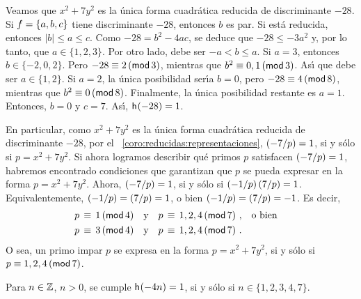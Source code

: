 \begin{ejemReducidas}\label{ejem:reducidas}
	Veamos que $x^2+7y^2$ es la \'unica forma cuadr\'atica
	reducida de discriminante $-28$. Si $f=\binaria{a,b,c}$
	tiene discriminante $-28$, entonces $b$ es par. Si est\'a
	reducida, entonces $|b|\leq a\leq c$. Como $-28=b^2-4ac$,
	se deduce que $-28\leq-3a^2$ y, por lo tanto, que
	$a\in\{1,2,3\}$. Por otro lado, debe ser $-a<b\leq a$.
	Si $a=3$, entonces $b\in\{-2,0,2\}$. Pero
	$-28\equiv 2\tmodulo[3]$, mientras que
	$b^2\equiv 0,1\tmodulo[3]$. As\'{\i} que debe ser
	$a\in\{1,2\}$. Si $a=2$, la \'unica posibilidad ser\'{\i}a
	$b=0$, pero $-28\equiv 4\tmodulo[8]$, mientras que
	$b^2\equiv 0\tmodulo[8]$. Finalmente, la \'unica posibilidad
	restante es $a=1$. Entonces, $b=0$ y $c=7$.
	As\'{\i}, $\nClases(-28)=1$.

	En particular, como $x^2+7y^2$ es la \'unica forma
	cuadr\'atica reducida de discriminante $-28$, por el
	\coroname~\ref{coro:reducidas:representaciones},
	$\tlegendre{-7} p=1$, si y s\'olo si $p=x^2+7y^2$.
	Si ahora logramos describir qu\'e primos $p$ satisfacen
	$\tlegendre{-7} p=1$, habremos encontrado condiciones
	que garantizan que $p$ se pueda expresar en la forma
	$p=x^2+7y^2$. Ahora,
	\begin{math}
		\tlegendre{-7} p=1
	\end{math},
	si y s\'olo si
	\begin{math}
		\tlegendre{-1} p\tlegendre 7 p=1
	\end{math}.
	Equivalentemente,
	\begin{math}
		\tlegendre{-1} p=\tlegendre 7 p=1
	\end{math},
	o bien
	\begin{math}
		\tlegendre{-1} p=\tlegendre 7 p=-1
	\end{math}.
	Es decir,
	\begin{displaymath}
		\begin{aligned}
			p & \,\equiv\,1\tmodulo[4]\dispand
			p\,\equiv\,1,2,4\tmodulo[7]\dispcomma\disporelse \\
			p & \,\equiv\,3\tmodulo[4]\dispand
			p\,\equiv\,1,2,4\tmodulo[7]
			\dispstop
		\end{aligned}
	\end{displaymath}
	O sea, un primo impar $p$ se expresa en la forma $p=x^2+7y^2$,
	si y s\'olo si $p\equiv 1,2,4\tmodulo[7]$.
\end{ejemReducidas}

\begin{teoReducidas}[Landau]\label{teo:landau}
	Para $n\in\Enteros$, $n>0$, se cumple
	$\nClases(-4n)=1$, si y s\'olo si $n\in\{1,2,3,4,7\}$.
\end{teoReducidas}

